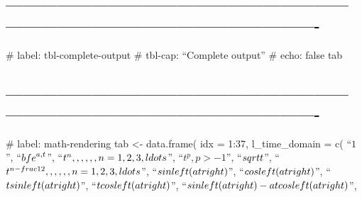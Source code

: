\documentclass[
  letterpaper,
  DIV=11,
  numbers=noendperiod]{scrartcl}
\begin{document}
\subsection{-------------------------------------------------------------------------------------------------------------------}\label{section-2}

\#\textbar{} label: tbl-complete-output \#\textbar{} tbl-cap: ``Complete
output'' \#\textbar{} echo: false tab

\subsection{-------------------------------------------------------------------------------------------------------------------}\label{section-3}

\#\textbar{} label: math-rendering tab \textless- data.frame( idx =
1:37, l\_time\_domain = c( ``\(1\)'', ``\({{\\bf{e}}^{a\\,t}}\)'',
``\({t^n},\\,\\,\\,\\,\\,n = 1,2,3, \\ldots\)'', ``\({t^p}, p > -1\)'',
``\(\\sqrt t\)'',
``\({t^{n - \\frac{1}{2}}},\\,\\,\\,\\,\\,n = 1,2,3, \\ldots\)'',
``\(\\sin \\left( {at} \\right)\)'',
``\(\\cos \\left( {at} \\right)\)'',
``\(t\\sin \\left( {at} \\right)\)'',
``\(t\\cos \\left( {at} \\right)\)'',
``\(\\sin \\left( {at} \\right) - at\\cos \\left( {at} \\right)\)'',
\end{document}
